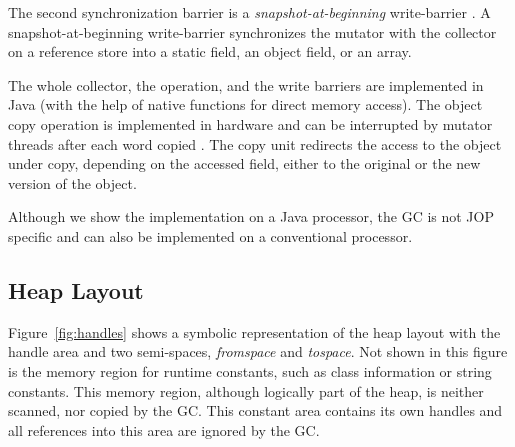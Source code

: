 The second synchronization barrier is a \emph{snapshot-at-beginning}
write-barrier \cite{gc:yuasa90}. A snapshot-at-beginning
write-barrier synchronizes the mutator with the collector on a
reference store into a static field, an object field, or an array.


The whole collector, the  operation, and the write barriers
are implemented in Java (with the help of native functions for direct
memory access). The object copy operation is implemented in hardware
and can be interrupted by mutator threads after each word copied
\cite{jop:nbobjcopy:jtres2008}. The copy unit redirects the access to
the object under copy, depending on the accessed field, either to the
original or the new version of the object.

Although we show the implementation on a Java processor, the GC is
not JOP specific and can also be implemented on a conventional
processor.

\subsection{Heap Layout}

Figure~\ref{fig:handles} shows a symbolic representation of the heap
layout with the handle area and two semi-spaces, \emph{fromspace} and
\emph{tospace}. Not shown in this figure is the memory region for
runtime constants, such as class information or string constants.
This memory region, although logically part of the heap, is neither
scanned, nor copied by the GC. This constant area contains its own
handles and all references into this area are ignored by the GC.

